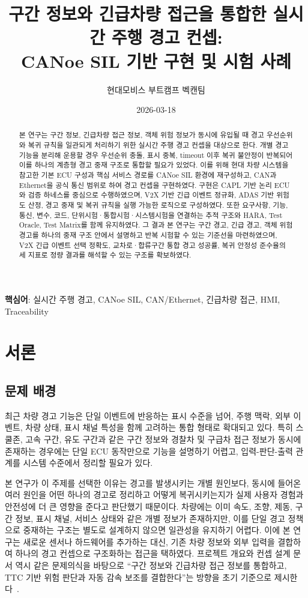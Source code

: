 \documentclass[10pt,a4paper,twocolumn]{article}
\title{구간 정보와 긴급차량 접근을 통합한 실시간 주행 경고 컨셉:\\CANoe SIL 기반 구현 및 시험 사례}
\author{현대모비스 부트캠프 벡캔팀}
\date{2026-03-18}
\begin{document}
\maketitle

\begin{abstract}
본 연구는 구간 정보, 긴급차량 접근 정보, 객체 위험 정보가 동시에 유입될 때 경고 우선순위와 복귀 규칙을 일관되게 처리하기 위한 실시간 주행 경고 컨셉을 대상으로 한다. 개별 경고 기능을 분리해 운용할 경우 우선순위 충돌, 표시 중복, timeout 이후 복귀 불안정이 반복되어 이를 하나의 계층형 경고 중재 구조로 통합할 필요가 있었다. 이를 위해 현대 차량 시스템을 참고한 기본 ECU 구성과 핵심 서비스 경로를 CANoe SIL 환경에 재구성하고, CAN과 Ethernet을 공식 통신 범위로 하여 경고 컨셉을 구현하였다. 구현은 CAPL 기반 논리 ECU와 검증 하네스를 중심으로 수행하였으며, V2X 기반 긴급 이벤트 정규화, ADAS 기반 위험도 산정, 경고 중재 및 복귀 규칙을 실행 가능한 로직으로 구성하였다. 또한 요구사항, 기능, 통신, 변수, 코드, 단위시험·통합시험·시스템시험을 연결하는 추적 구조와 HARA, Test Oracle, Test Matrix를 함께 유지하였다. 그 결과 본 연구는 구간 경고, 긴급 경고, 객체 위험 경고를 하나의 중재 구조 안에서 설명하고 반복 시험할 수 있는 기준선을 마련하였으며, V2X 긴급 이벤트 선택 정확도, 교차로·합류구간 통합 경고 성공률, 복귀 안정성 준수율의 세 지표로 정량 결과를 해석할 수 있는 구조를 확보하였다.
\end{abstract}

\noindent\textbf{핵심어}: 실시간 주행 경고, CANoe SIL, CAN/Ethernet, 긴급차량 접근, HMI, Traceability

\tableofcontents

\section{서론}

\subsection{문제 배경}

최근 차량 경고 기능은 단일 이벤트에 반응하는 표시 수준을 넘어, 주행 맥락, 외부 이벤트, 차량 상태, 표시 채널 특성을 함께 고려하는 통합 형태로 확대되고 있다. 특히 스쿨존, 고속 구간, 유도 구간과 같은 구간 정보와 경찰차 및 구급차 접근 정보가 동시에 존재하는 경우에는 단일 ECU 동작만으로 기능을 설명하기 어렵고, 입력-판단-출력 관계를 시스템 수준에서 정리할 필요가 있다.

본 연구가 이 주제를 선택한 이유는 경고를 발생시키는 개별 원인보다, 동시에 들어온 여러 원인을 어떤 하나의 경고로 정리하고 어떻게 복귀시키는지가 실제 사용자 경험과 안전성에 더 큰 영향을 준다고 판단했기 때문이다. 차량에는 이미 속도, 조향, 제동, 구간 정보, 표시 채널, 서비스 상태와 같은 개별 정보가 존재하지만, 이를 단일 경고 정책으로 중재하는 구조는 별도로 설계하지 않으면 일관성을 유지하기 어렵다. 이에 본 연구는 새로운 센서나 하드웨어를 추가하는 대신, 기존 차량 정보와 외부 입력을 결합하여 하나의 경고 컨셉으로 구조화하는 접근을 택하였다. 프로젝트 개요와 컨셉 설계 문서 역시 같은 문제의식을 바탕으로 ``구간 정보와 긴급차량 접근 정보를 통합하고, TTC 기반 위험 판단과 자동 감속 보조를 결합한다''는 방향을 초기 기준으로 제시한다~\cite{proj_overview,concept_design}.
\end{document}

